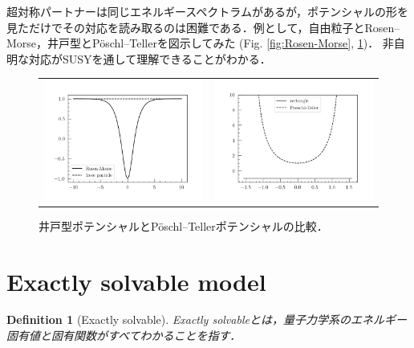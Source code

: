 \documentclass[english, dvipdfmx, a4paper]{jsarticle}
\theoremstyle{break}
\newtheorem{defn}[thm]{Definition}
\begin{document}
	超対称パートナーは同じエネルギースペクトラムがあるが，ポテンシャルの形を見ただけでその対応を読み取るのは困難である．例として，自由粒子とRosen--Morse，井戸型とP\"{o}schl--Tellerを図示してみた (Fig. \ref{fig:Rosen-Morse}, \ref{fig:Poeschl-Teller})．
	非自明な対応がSUSYを通して理解できることがわかる．
		\begin{figure}[t]
			\centering
			\begin{tabular}{cc}
				\begin{minipage}[t]{0.45\hsize}
					\centering
					\includegraphics[width=6cm]{./potentials/free-RM.png}
					\caption{自由粒子とRosen--Morseポテンシャルの比較．}
					\label{fig:Rosen-Morse}
				\end{minipage}&
				\begin{minipage}[t]{0.45\hsize}
					\centering
					\includegraphics[width=6cm]{./potentials/rectangle-PT.png}
					\caption{井戸型ポテンシャルとP\"{o}schl--Tellerポテンシャルの比較．}
					\label{fig:Poeschl-Teller}
				\end{minipage}
			\end{tabular}
		\end{figure}

	\section{Exactly solvable model}
	\begin{defn}[Exactly solvable]
		Exactly solvableとは，量子力学系のエネルギー固有値と固有関数がすべてわかることを指す．
	\end{defn}
	
\end{document}
